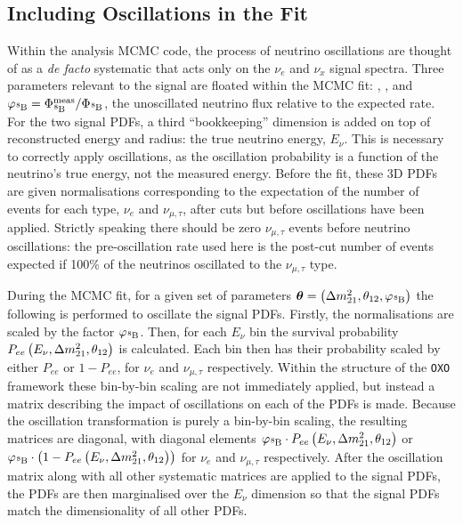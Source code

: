 \subsection{Including Oscillations in the Fit}\label{sec:osc_in_fit}
Within the analysis MCMC code, the process of neutrino oscillations are thought of as a \textit{de facto} systematic that acts only on the \beight{} $\nu_{e}$ and $\nu_{x}$ signal spectra. Three parameters relevant to the signal are floated within the MCMC fit: \dmsq{}, \tonetwo{}, and $\varphi_{\beight{}}=\Phi_{\ce{^{8}B}}^{\mathrm{meas}}/\Phi_{\ce{^{8}B}}$, the unoscillated  neutrino flux relative to the expected rate. For the two signal PDFs, a third ``bookkeeping'' dimension is added on top of reconstructed energy and radius: the true neutrino energy, $E_{\nu}$. This is necessary to correctly apply oscillations, as the oscillation probability is a function of the neutrino's true energy, not the measured energy. Before the fit, these 3D PDFs are given normalisations corresponding to the expectation of the number of events for each type, $\nu_{e}$ and $\nu_{\mu,\tau}$, after cuts but before oscillations have been applied. Strictly speaking there should be zero $\nu_{\mu,\tau}$ events before neutrino oscillations: the pre-oscillation rate used here is the post-cut number of events expected if 100\% of the neutrinos oscillated to the $\nu_{\mu,\tau}$ type.

During the MCMC fit, for a given set of parameters $\bm{\theta} = \left(\dmsq{}, \tonetwo{}, \varphi_{\beight{}}\right)$ the following is performed to oscillate the signal PDFs. Firstly, the normalisations are scaled by the factor $\varphi_{\beight{}}$. Then, for each $E_{\nu}$ bin the survival probability $P_{ee}\left(E_{\nu}, \Delta m^{2}_{21}{}, \theta_{12}{}\right)$ is calculated. Each bin then has their probability scaled by either $P_{ee}$ or $1-P_{ee}$, for $\nu_{e}$ and $\nu_{\mu,\tau}$ respectively. Within the structure of the \texttt{OXO} framework these bin-by-bin scaling are not immediately applied, but instead a matrix describing the impact of oscillations on each of the PDFs is made. Because the oscillation transformation is purely a bin-by-bin scaling, the resulting matrices are diagonal, with diagonal elements $\varphi_{\beight{}}\cdot P_{ee}\left(E_{\nu}, \dmsq{}, \tonetwo{}\right)$ or $\varphi_{\beight{}}\cdot\left(1-P_{ee}\left(E_{\nu}, \dmsq{}, \tonetwo{}\right)\right)$ for $\nu_{e}$ and $\nu_{\mu,\tau}$ respectively. After the oscillation matrix along with all other systematic matrices are applied to the signal PDFs, the PDFs are then marginalised over the $E_{\nu}$ dimension so that the signal PDFs match the dimensionality of all other PDFs.

